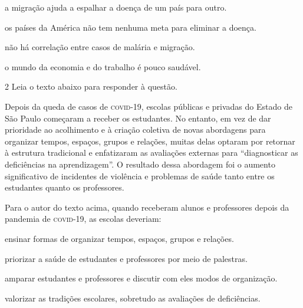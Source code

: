 \begin{escolha}

  \item a migração ajuda a espalhar a doença de um país para outro.

  \item os países da América não tem nenhuma meta para eliminar a doença.

  \item não há correlação entre casos de malária e migração. 

  \item o mundo da economia e do trabalho é pouco saudável.

\end{escolha}

\num{2} Leia o texto abaixo para responder à questão.
\enlargethispage{2\baselineskip}

\begin{myquote}
Depois da queda de casos de \textsc{covid}-19, escolas públicas e privadas 
do Estado de São Paulo começaram a receber os estudantes. No entanto, em vez 
de dar prioridade ao acolhimento e à criação coletiva de novas abordagens para
organizar tempos, espaços, grupos e relações, muitas delas optaram por retornar 
à estrutura tradicional e enfatizaram as avaliações externas para ``diagnosticar 
as deficiências na aprendizagem''. O resultado dessa abordagem foi o aumento 
significativo de incidentes de violência e problemas de saúde tanto entre os
estudantes quanto os professores.

\end{myquote}

Para o autor do texto acima, quando receberam alunos e professores depois da pandemia de 
\textsc{covid}-19, as escolas deveriam: 

\begin{escolha}

  \item ensinar formas de organizar tempos, espaços, grupos e relações.

  \item priorizar a saúde de estudantes e professores por meio de palestras.

  \item amparar estudantes e professores e discutir com eles modos de organização.

  \item valorizar as tradições escolares, sobretudo as avaliações de deficiências.  

\end{escolha}

